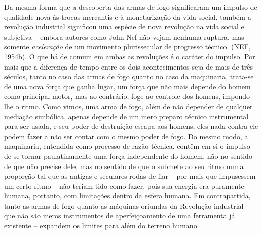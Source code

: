 Da mesma forma que a descoberta das armas de fogo significaram um
impulso de qualidade nova às trocas mercantis e à monetarização da vida
social, também a revolução industrial significou uma espécie de nova
revolução na vida social e subjetiva -- embora autores como John Nef não
vejam nenhuma ruptura, mas somente \emph{aceleração} de um movimento
plurissecular de progresso técnico. (NEF, 1954b). O que há de comum em
ambas as revoluções é o caráter do impulso. Por mais que a diferença de
tempo entre os dois acontecimentos seja de mais de três séculos, tanto
no caso das armas de fogo quanto no caso da maquinaria, trata-se de uma
nova força que ganha lugar, um força que não mais depende do homem como
principal motor, mas ao contrário, foge ao controle dos homens,
impondo-lhe o ritmo. Como vimos, uma arma de fogo, além de não depender
de qualquer mediação simbólica, apenas depende de um mero preparo
técnico instrumental para ser usada, e seu poder de destruição escapa
aos homens, eles nada contra ele podem fazer a não ser contar com o
mesmo poder de fogo. Do mesmo modo, a maquinaria, entendida como
processo de razão técnica, contêm em si o impulso de se tornar
paulatinamente uma força independente do homem, não no sentido de que
não precise dele, mas no sentido de que o submete ao seu ritmo numa
proporção tal que as antigas e seculares rodas de fiar -- por mais que
impusessem um certo ritmo -- não teriam tido como fazer, pois sua
energia era puramente humana, portanto, com limitações dentro da esfera
humana. Em contrapartida, tanto as armas de fogo quanto as máquinas
oriundas da Revolução industrial -- que não são meros instrumentos de
aperfeiçoamento de uma ferramenta já existente -- expandem os limites
para além do terreno humano.


